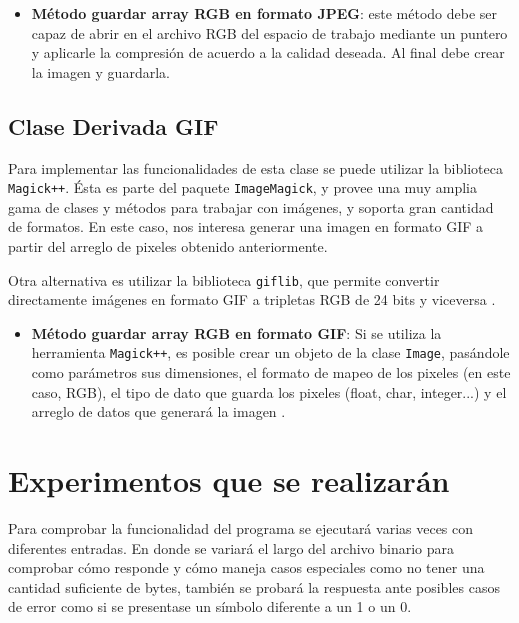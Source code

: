 \begin{itemize}
    \item \textbf{Método guardar array RGB en formato JPEG}: este método debe ser capaz de abrir en el archivo RGB del espacio de trabajo mediante un puntero y aplicarle la compresión de acuerdo a la calidad deseada. Al final debe crear la imagen y guardarla.
\end{itemize}


\subsection{Clase Derivada GIF}
Para implementar las funcionalidades de esta clase se puede utilizar la biblioteca \texttt{Magick++}. Ésta es parte del paquete \texttt{ImageMagick}, y provee una muy amplia gama de clases y métodos para trabajar con imágenes, y soporta gran cantidad de formatos. En este caso, nos interesa generar una imagen en formato GIF a partir del arreglo de pixeles obtenido anteriormente.

Otra alternativa es utilizar la biblioteca \texttt{giflib}, que permite convertir directamente imágenes en formato GIF a tripletas RGB de 24 bits y viceversa \cite{R8}.

\begin{itemize}
    \item \textbf{Método guardar array RGB en formato GIF}: Si se utiliza la herramienta \texttt{Magick++}, es posible crear un objeto de la clase \texttt{Image}, pasándole como parámetros sus dimensiones, el formato de mapeo de los pixeles (en este caso, RGB), el tipo de dato que guarda los pixeles (float, char, integer...) y el arreglo de datos que generará la imagen \cite{R9}. 
\end{itemize}

\section{Experimentos que se realizarán}


Para comprobar la funcionalidad del programa se ejecutará varias veces con diferentes entradas. En donde se variará el largo del archivo binario para comprobar cómo responde y cómo maneja casos especiales como no tener una cantidad suficiente de bytes, también se probará la respuesta ante posibles casos de error como si se presentase un símbolo diferente a un 1 o un 0. 

